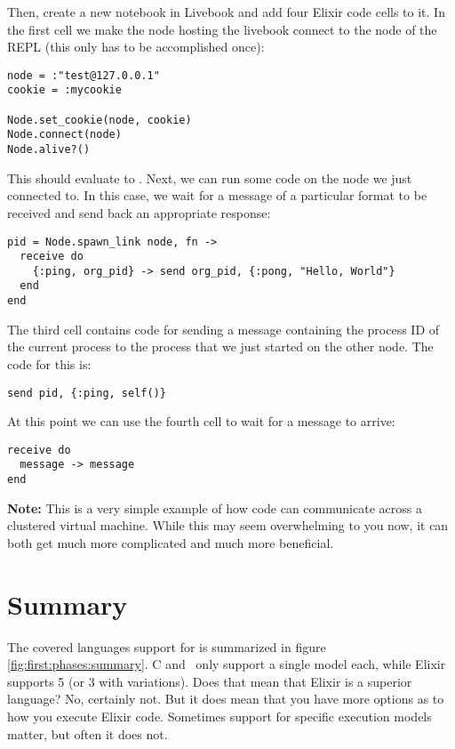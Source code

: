 Then, create a new notebook in Livebook and add four Elixir code cells to it. In the first cell we make the node hosting the livebook connect to the node of the REPL (this only has to be accomplished once):

\begin{verbatim}
node = :"test@127.0.0.1"
cookie = :mycookie

Node.set_cookie(node, cookie)
Node.connect(node)
Node.alive?()
\end{verbatim}

This should evaluate to . Next, we can run some code on the node we just connected to. In this case, we wait for a message of a particular format to be received and send back an appropriate response:

\begin{verbatim}
pid = Node.spawn_link node, fn ->
  receive do
    {:ping, org_pid} -> send org_pid, {:pong, "Hello, World"}
  end
end
\end{verbatim}

The third cell contains code for sending a message containing the process ID of the current process to the process that we just started on the other node. The code for this is:

\begin{verbatim}
send pid, {:ping, self()}
\end{verbatim}

At this point we can use the fourth cell to wait for a message to arrive:

\begin{verbatim}
receive do
  message -> message
end
\end{verbatim}

\textbf{Note:} This is a very simple example of how code can communicate across a clustered virtual machine. While this may seem overwhelming to you now, it can both get much more complicated and much more beneficial.

\section{Summary}

The covered languages support for  is summarized in figure \ref{fig:first:phases:summary}. C and \csharp\ only support a single model each, while Elixir supports 5 (or 3 with variations). Does that mean that Elixir is a superior language? No, certainly not. But it does mean that you have more options as to how you execute Elixir code. Sometimes support for specific execution models matter, but often it does not.

